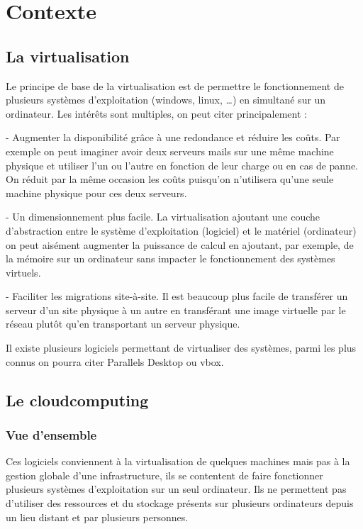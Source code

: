 \documentclass[a4paper,oneside]{report}
\begin{document}
\section{Contexte}
\subsection{La \gls{virtualisation}}
Le principe de base de la \gls{virtualisation} est de permettre le fonctionnement de plusieurs systèmes d'exploitation (\gls{windows}, \gls{linux}, …) en simultané sur un ordinateur.
Les intérêts sont multiples, on peut citer principalement :\newline

- Augmenter la disponibilité grâce à une redondance et réduire les coûts.
Par exemple on peut imaginer avoir deux serveurs mails sur une même machine physique et utiliser l'un ou l'autre en fonction de leur charge ou en cas de panne.
On réduit par la même occasion les coûts puisqu'on n'utilisera qu'une seule machine physique pour ces deux serveurs.\newline

- Un dimensionnement plus facile. La \gls{virtualisation} ajoutant une couche d'abstraction entre le système d'exploitation (logiciel) et le matériel (ordinateur) on peut aisément augmenter la puissance de calcul en ajoutant, par exemple, de la mémoire sur un ordinateur sans impacter le fonctionnement des systèmes virtuels.\newline

- Faciliter les migrations site-à-site.
Il est beaucoup plus facile de transférer un serveur d'un site physique à un autre en transférant une image virtuelle par le réseau plutôt qu'en transportant un serveur physique.\newline

Il existe plusieurs logiciels permettant de virtualiser des systèmes, parmi les plus connus on pourra citer Parallels Desktop ou \gls{vbox}.

\subsection{Le \gls{cloudcomputing}}
\subsubsection{Vue d'ensemble}
Ces logiciels conviennent à la \gls{virtualisation} de quelques machines mais pas à la gestion globale d'une infrastructure, ils se contentent de faire fonctionner plusieurs systèmes d'exploitation sur un seul ordinateur.
Ils ne permettent pas d'utiliser des ressources et du stockage présents sur plusieurs ordinateurs depuis un lieu distant et par plusieurs personnes.
\end{document}

